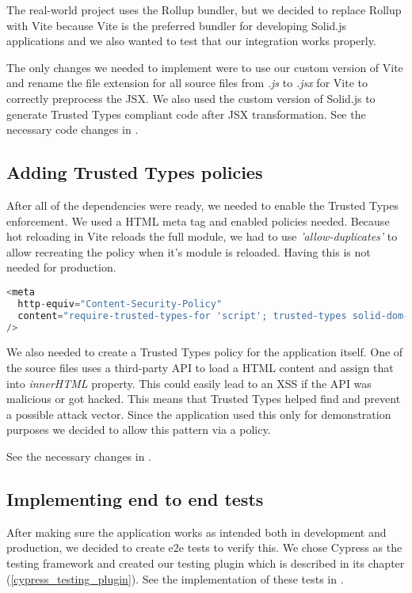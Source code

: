 The real-world project uses the Rollup bundler, but we decided to replace Rollup with Vite because
Vite is the preferred bundler for developing Solid.js applications and we also wanted to test that
our integration works properly.

The only changes we needed to implement were to use our custom version of Vite and rename the file
extension for all source files from \emph{.js} to \emph{.jsx} for Vite to correctly preprocess the
JSX. We also used the custom version of Solid.js to generate Trusted Types compliant code after JSX
transformation. See the necessary code changes in \cite{solid_realworld_project:vite}.

\subsection{Adding Trusted Types policies}

After all of the dependencies were ready, we needed to enable the Trusted Types enforcement. We used
a HTML meta tag and enabled policies needed. Because hot reloading in Vite reloads the full module,
we had to use \emph{'allow-duplicates'} to allow recreating the policy when it's module is reloaded.
Having this is not needed for production.

\bigskip
\begin{lstlisting}[language=JavaScript, caption=Creation of style elements using \emph{innerHTML} in Vite \cite{commit_vite_inner_html_styles}]
<meta
  http-equiv="Content-Security-Policy"
  content="require-trusted-types-for 'script'; trusted-types solid-dom-expressions trusted-article vite-overlay 'allow-duplicates';"
/>
\end{lstlisting}

We also needed to create a Trusted Types policy for the application itself. One of the source files
uses a third-party API to load a HTML content and assign that into \emph{innerHTML} property. This
could easily lead to an XSS if the API was malicious or got hacked. This means that Trusted Types
helped find and prevent a possible attack vector. Since the application used this only for
demonstration purposes we decided to allow this pattern via a policy.

See the necessary changes in \cite{solid_realworld_project:tt_policy}.

\subsection{Implementing end to end tests}

After making sure the application works as intended both in development and production, we decided
to create e2e tests to verify this. We chose Cypress as the testing framework and created our
testing plugin which is described in its chapter (\ref{cypress_testing_plugin}). See the
implementation of these tests in \cite{solid_realworld_project:tests}.

